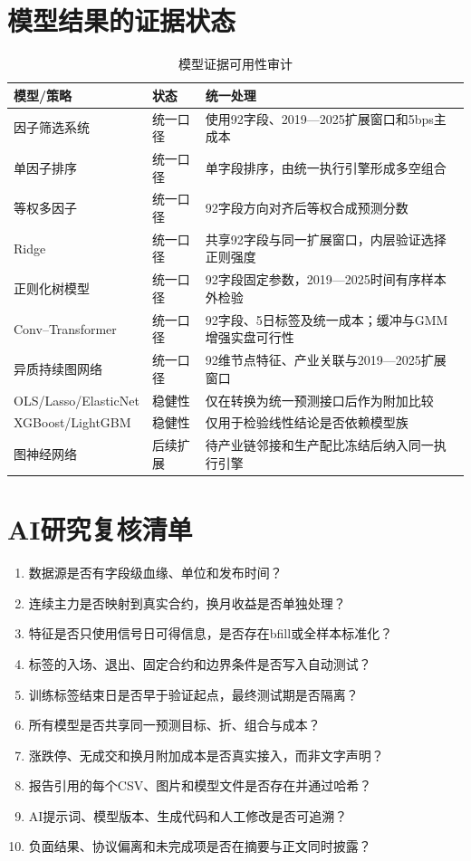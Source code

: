 \documentclass[UTF8,zihao=-4,fontset=ubuntu]{ctexart}
\begin{document}
\section{模型结果的证据状态}

\begin{table}[H]
\centering
\caption{模型证据可用性审计}
\begin{tabularx}{\textwidth}{Y C{2.3cm} Y}
\toprule
模型/策略 & 状态 & 统一处理 \\
\midrule
因子筛选系统 & 统一口径 & 使用92字段、2019—2025扩展窗口和5bps主成本 \\
单因子排序 & 统一口径 & 单字段排序，由统一执行引擎形成多空组合 \\
等权多因子 & 统一口径 & 92字段方向对齐后等权合成预测分数 \\
Ridge & 统一口径 & 共享92字段与同一扩展窗口，内层验证选择正则强度 \\
正则化树模型 & 统一口径 & 92字段固定参数，2019—2025时间有序样本外检验 \\
Conv--Transformer & 统一口径 & 92字段、5日标签及统一成本；缓冲与GMM增强实盘可行性 \\
异质持续图网络 & 统一口径 & 92维节点特征、产业关联与2019—2025扩展窗口 \\
OLS/Lasso/ElasticNet & 稳健性 & 仅在转换为统一预测接口后作为附加比较 \\
XGBoost/LightGBM & 稳健性 & 仅用于检验线性结论是否依赖模型族 \\
图神经网络 & 后续扩展 & 待产业链邻接和生产配比冻结后纳入同一执行引擎 \\
\bottomrule
\end{tabularx}
\end{table}

\section{AI研究复核清单}

\begin{enumerate}[label=\arabic*.]
\item 数据源是否有字段级血缘、单位和发布时间？
\item 连续主力是否映射到真实合约，换月收益是否单独处理？
\item 特征是否只使用信号日可得信息，是否存在bfill或全样本标准化？
\item 标签的入场、退出、固定合约和边界条件是否写入自动测试？
\item 训练标签结束日是否早于验证起点，最终测试期是否隔离？
\item 所有模型是否共享同一预测目标、折、组合与成本？
\item 涨跌停、无成交和换月附加成本是否真实接入，而非文字声明？
\item 报告引用的每个CSV、图片和模型文件是否存在并通过哈希？
\item AI提示词、模型版本、生成代码和人工修改是否可追溯？
\item 负面结果、协议偏离和未完成项是否在摘要与正文同时披露？
\end{enumerate}
\end{document}

